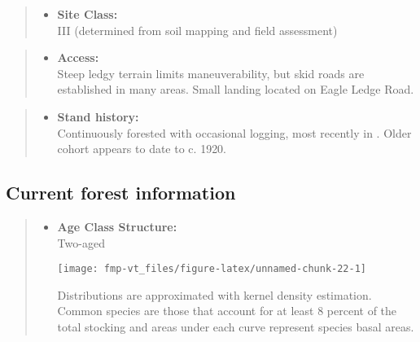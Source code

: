 \documentclass[]{tufte-handout}
\providecommand{\tightlist}{%
  \setlength{\itemsep}{0pt}\setlength{\parskip}{0pt}}
\begin{document}
\begin{quote}
\begin{itemize}
\tightlist
\item
  \textbf{Site Class:}\\
  \vspace{2pt} III (determined from soil mapping and field assessment)
\end{itemize}
\end{quote}

\begin{quote}
\begin{itemize}
\tightlist
\item
  \textbf{Access:}\\
  \vspace{2pt} Steep ledgy terrain limits maneuverability, but skid
  roads are established in many areas. Small landing located on Eagle
  Ledge Road.
\end{itemize}
\end{quote}

\begin{quote}
\begin{itemize}
\tightlist
\item
  \textbf{Stand history:}\\
  \vspace{2pt} Continuously forested with occasional logging, most
  recently in . Older cohort appears to date to c. 1920.
\end{itemize}
\end{quote}

\subsection{Current forest
information}\label{current-forest-information-4}

\begin{quote}
\begin{itemize}
\tightlist
\item
  \textbf{Age Class Structure:}\\
  \vspace{2pt} Two-aged\\

  \begin{marginfigure}
  \texttt{[image: fmp-vt\_files/figure-latex/unnamed-chunk-22-1]} \caption[Distributions are approximated with kernel density estimation]{Distributions are approximated with kernel density estimation. Common species are those that account for at least 8 percent of the total stocking and areas under each curve represent species basal areas.}\label{fig:unnamed-chunk-22}
  \end{marginfigure}
\end{itemize}
\end{quote}
\end{document}
